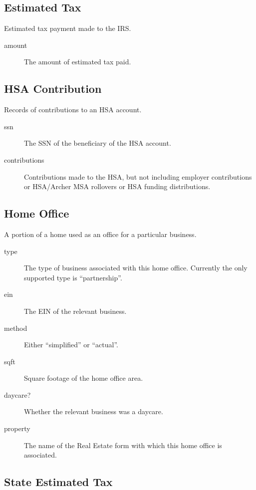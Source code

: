 \documentclass[12pt]{article}
\begin{document}
\subsection{Estimated Tax}

Estimated tax payment made to the IRS.

\begin{description}
\item[amount] The amount of estimated tax paid.
\end{description}

\subsection{HSA Contribution}

Records of contributions to an HSA account.

\begin{description}
\item[ssn] The SSN of the beneficiary of the HSA account.
\item[contributions] Contributions made to the HSA, but not including employer
contributions or HSA/Archer MSA rollovers or HSA funding distributions.
\end{description}

\subsection{Home Office}

A portion of a home used as an office for a particular business.

\begin{description}
\item[type] The type of business associated with this home office. Currently the
only supported type is ``partnership''.
\item[ein] The EIN of the relevant business.
\item[method] Either ``simplified'' or ``actual''.
\item[sqft] Square footage of the home office area.
\item[daycare?] Whether the relevant business was a daycare.
\item[property] The name of the Real Estate form with which this home office is
associated.
\end{description}

\subsection{State Estimated Tax}
\end{document}
